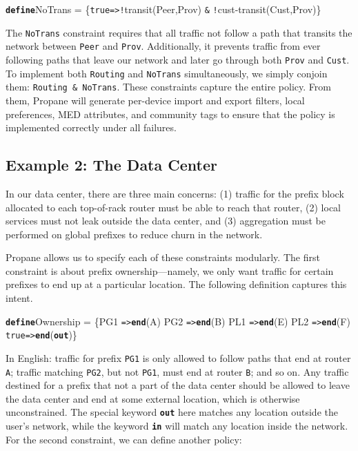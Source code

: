 \documentclass[10pt]{sigalternate052015}
\newcommand{\sysname}{{\small \sf Propane}\xspace}
\newcommand{\CD}[1]{\texttt{\small #1}}  %
\newcommand{\KW}[1]{\texttt{\small\bfseries{#1}}}
\newcommand{\True}{\CD{true}}
\newcommand{\Define}{\KW{define}}
\newcommand{\Path}{\texttt{=>}}
\newcommand{\In}{\KW{in}}
\newcommand{\Out}{\KW{out}}
\newcommand{\AND}{\texttt{\&}}
\newcommand{\NOT}{\texttt{!}}
\newcommand{\End}{\KW{end}}
\renewcommand{\path}[2]{ #1 \mapsto \ensuremath{#2} }
\begin{document}
\begin{code}
\Define NoTrans = 
  \{\True \Path \NOT{}transit(Peer,Prov) \AND 
           \NOT{}cust-transit(Cust,Prov)\}
\end{code}
\noindent
The \CD{NoTrans} constraint requires that all traffic not follow a path that transits the network between \CD{Peer} and \CD{Prov}.
Additionally, it prevents traffic from ever following paths that leave our network and later go through both \CD{Prov} and \CD{Cust}.  To implement both \CD{Routing}
and \CD{NoTrans} simultaneously, we simply conjoin them: \CD{Routing \AND{} NoTrans}.
%
%
These constraints capture the entire policy. From them, \sysname will generate per-device import and export filters, local preferences,
MED attributes, and community tags to ensure that the policy is
implemented correctly under all failures.

\subsection{Example 2: The Data Center}

In our data center,
there are three main concerns:
(1) traffic for the prefix block allocated to each top-of-rack router must be able to reach that router,
(2) local services must not leak outside the data center, and
(3) aggregation must be performed on global prefixes to reduce churn
in the network.

\sysname allows us to specify each of these constraints modularly. The first constraint is about prefix ownership---namely, we only want traffic for certain prefixes to end up at a particular location. The following definition captures this intent.


\begin{code}
\Define Ownership = 
    \{PG1 \Path \End(A)
     PG2 \Path \End(B)
     PL1 \Path \End(E)
     PL2 \Path \End(F)
     \True \Path \End(\Out)\}
\end{code}
\noindent
In English: traffic for prefix \CD{PG1} is only allowed to follow paths that
end at router \CD{A}; traffic matching \CD{PG2},
but not \CD{PG1}, must
end at router \CD{B}; and so on.
Any traffic destined for a prefix that not a part of the data center should be allowed to leave the data center and end at some external location, which is otherwise unconstrained.
The special keyword \Out{} here matches any location outside the user's network, while the keyword \In{} will match any location inside the network.
For the second constraint, we can define another policy:
\end{document}

